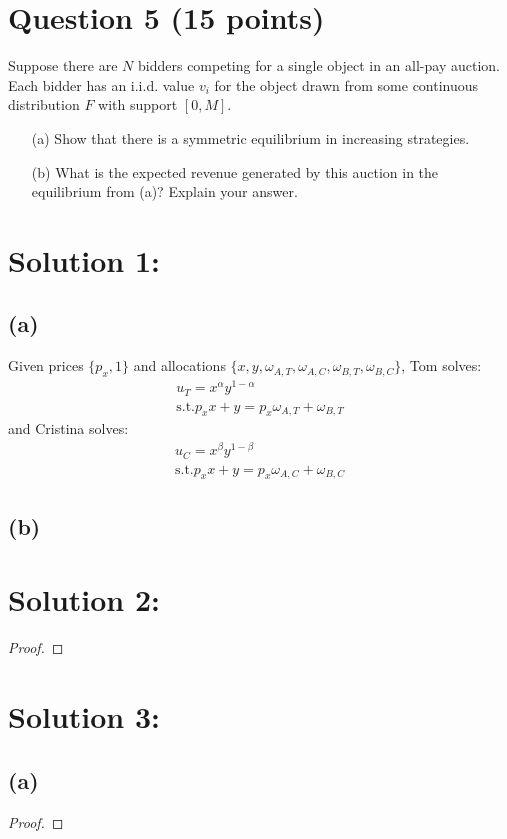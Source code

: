 \documentclass[10pt,a4paper]{article}
\begin{document}
\section*{Question 5 (15 points)}
Suppose there are $N$ bidders competing for a single object in an all-pay auction. Each bidder has an i.i.d. value $v_i$ for the object drawn from some continuous distribution $F$ with support $[0, M]$.
\begin{enumerate}
    \item[(a)] Show that there is a symmetric equilibrium in increasing strategies.
    \item[(b)] What is the expected revenue generated by this auction in the equilibrium from (a)? Explain your answer.
\end{enumerate}
\section*{Solution 1:}
  \subsection*{(a)}
    Given prices $\{p_x, 1\}$ and allocations $\{x,y,\omega_{A,T}, \omega_{A,C}, \omega_{B, T}, \omega_{B,C}\}$, 
    Tom solves:
    \begin{gather*}
        u_T = x^{\alpha}y^{1-\alpha} \\
        \text{s.t.}
        p_xx + y = p_x\omega_{A,T} + \omega_{B,T}
    \end{gather*}
    and Cristina solves:
    \begin{gather*}
        u_C = x^{\beta}y^{1-\beta} \\
        \text{s.t.}
        p_xx + y = p_x\omega_{A,C} + \omega_{B,C}
    \end{gather*}
  \subsection*{(b)}
\section*{Solution 2:}
  \begin{proof}
  \end{proof}
\section*{Solution 3:}
  \subsection*{(a)}
    \begin{proof}
    \end{proof}
\end{document}

